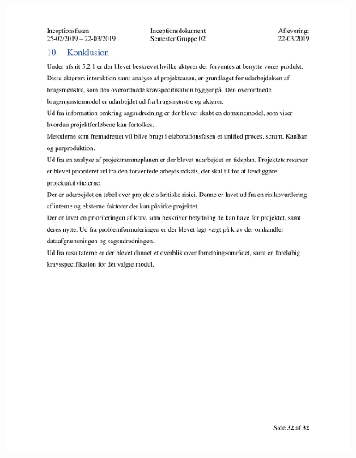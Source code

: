 \begin{figure}[hb]
  \includegraphics[scale = 0.33]{./PNG/Inceptions/Gruppe02+InceptionsDokument-33.jpg} 
\end{figure}


